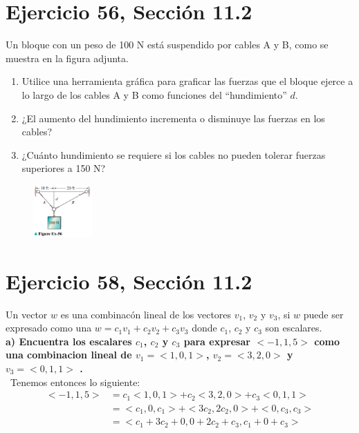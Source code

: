 \documentclass[11pt,letterpaper]{article}
\begin{document}
\section{Ejercicio 56, Sección 11.2}
Un bloque con un peso de 100 N está suspendido por cables A y B, como se muestra en la figura adjunta.
\begin{enumerate}
    \item Utilice una herramienta gráfica para graficar las fuerzas que el bloque ejerce a lo largo de los cables A y B como funciones del ``hundimiento'' $d$.
    \item ¿El aumento del hundimiento incrementa o disminuye las fuerzas en los cables?
    \item ¿Cuánto hundimiento se requiere si los cables no pueden tolerar fuerzas superiores a 150 N?
\end{enumerate}

\begin{figure}[h]
    \centering
    \includegraphics[width=0.2\textwidth]{imagenes/Figure_Ex-56.png}
\end{figure}


\section{Ejercicio 58, Sección 11.2}
Un vector $w$ es una combinacón lineal de los vectores $v_1$, $v_2$ y $v_3$, si $w$ puede ser expresado como una $w=c_1v_1+c_2v_2+c_3v_3$ donde $c_1$, $c_2$ y $c_3$  son escalares.\\
\textbf{a) Encuentra los escalares $c_1$, $c_2$ y $c_3$ para expresar $<-1,1,5>$ como una combinacion lineal de $v_1=<1,0,1>$, $v_2=<3,2,0>$ y $v_3=<0,1,1>$ .}\\\
Tenemos entonces lo siguiente:
\begin{equation*}
    \begin{split}
        <-1,1,5> &= c_1<1,0,1> + c_2<3,2,0> + c_3<0,1,1>\\
        &=<c_1,0,c_1> + <3c_2,2c_2,0> + <0,c_3,c_3>\\
        &=<c_1+3c_2+0,0+2c_2+c_3,c_1+0+c_3>
    \end{split}
\end{equation*}
\end{document}
